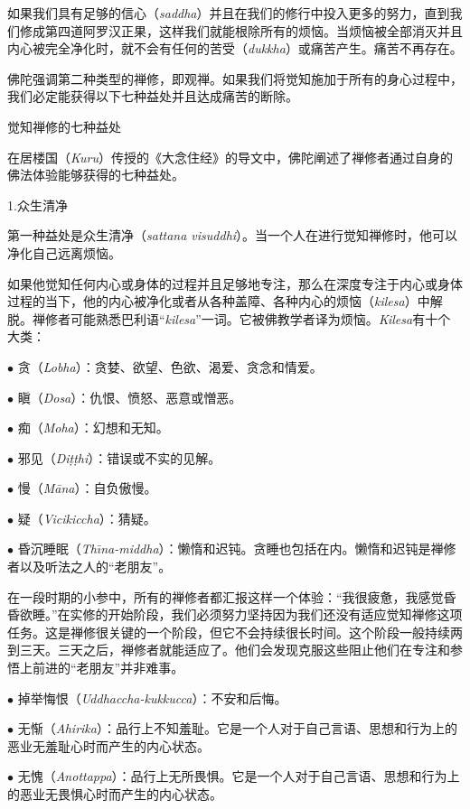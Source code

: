 如果我们具有足够的信心（{\it saddha}）并且在我们的修行中投入更多的努力，直到我们修成第四道阿罗汉正果，这样我们就能根除所有的烦恼。当烦恼被全部消灭并且内心被完全净化时，就不会有任何的苦受（{\it dukkha}）或痛苦产生。痛苦不再存在。

佛陀强调第二种类型的禅修，即观禅。如果我们将觉知施加于所有的身心过程中，我们必定能获得以下七种益处并且达成痛苦的断除。

\ssubsectnon 觉知禅修的七种益处

在居楼国（{\it Kuru}）传授的《大念住经》的导文中，佛陀阐述了禅修者通过自身的佛法体验能够获得的七种益处。

\sssubsectnon 1.众生清净

第一种益处是众生清净（{\it sattana visuddhi}）。当一个人在进行觉知\1禅修时，他可以净化自己远离烦恼。

如果他觉知任何内心或身体的过程并且足够地专注，那么在深度专注于内心或身体过程的当下，他的内心被净化或者从各种盖障、各种内心的烦恼（{\it kilesa}）中解脱。禅修者可能熟悉巴利语“{\it kilesa}”一词。它被佛教学者译为烦恼。{\it Kilesa}有十个大类：

{
\leftskip=1.6pc
\item{$\bullet$} 贪（{\it Lobha}）：贪婪、欲望、色欲、渴爱、贪念和情爱。
\item{$\bullet$} 瞋（{\it Dosa}）：仇恨、愤怒、恶意或憎恶。
\item{$\bullet$} 痴（{\it Moha}）：幻想和无知。
\item{$\bullet$} 邪见（{\it Di\d t\d thi}）：错误或不实的见解。
\item{$\bullet$} 慢（{\it M\=ana}）：自负傲慢。
\item{$\bullet$} 疑（{\it Vicikiccha}）：猜疑。
\item{$\bullet$} 昏沉睡眠（{\it Th\=\i na-middha}）：懒惰和迟钝。贪睡也包括在内。懒惰和迟钝是禅修者以及听法之人的“老朋友”。

}

在一段时期的小参中，所有的禅修者都汇报这样一个体验：“我很疲惫，我感觉昏昏欲睡。”在实修的开始阶段，我们必须努力坚持因为我们还没有适应觉知禅修这项任务。这是禅修很关键的一个阶段，但它不会持续很长时间。这个阶段一般持续两到三天。三天之后，禅修者就能适应了。他们会发现克服这些阻止他们在专注和参悟上前进的“老朋友”并非难事。

{
\leftskip=1.6pc
\item{$\bullet$} 掉举悔恨（{\it Uddhaccha-kukkucca}）：不安和后悔。
\item{$\bullet$} 无惭（{\it Ahirika}）：品行上不知羞耻。它是\1一个人对于自己言语、思想和行为上的恶业无羞耻心时而产生的内心状态。
\item{$\bullet$} 无愧（{\it Anottappa}）：品行上无所畏惧。它是一个人对于自己言语、思想和行为上的恶业无畏惧心时而产生的内心状态。

}

